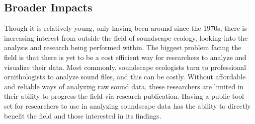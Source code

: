 \subsection{Broader Impacts}
Though it is relatively young, only having been around since the 1970\textquotesingle s, there is increasing interest from outside the field of soundscape ecology, looking into the analysis and research being performed within. The biggest problem facing the field is that there is yet to be a cost efficient way for researchers to analyze and visualize their data. Most commonly, soundscape ecologists turn to professional ornithologists to analyze sound files, and this can be costly. Without affordable and reliable ways of analyzing raw sound data, these researchers are limited in their ability to progress the field via research publication. Having a public tool set for researchers to use in analyzing soundscape data has the ability to directly benefit the field and those interested in its findings.